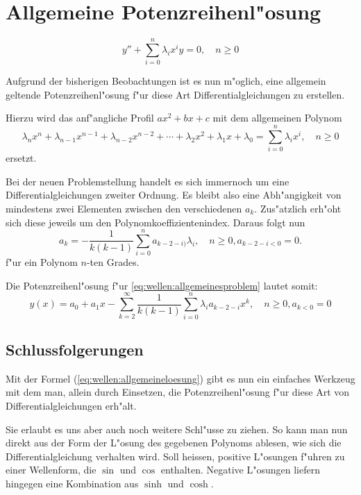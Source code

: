 \section{Allgemeine Potenzreihenl"osung}

\begin{equation}
	y''+\sum_{i=0}^{n}\lambda_ix^i y=0, \quad n \ge 0
	\label{eq:wellen:allgemeinesproblem}
\end{equation}

Aufgrund der bisherigen Beobachtungen ist es nun m"oglich, eine 
allgemein geltende Potenzreihenl"osung f"ur diese Art Differentialgleichungen 
zu erstellen.

Hierzu wird das anf"angliche Profil $ax^2 + bx + c$ mit dem allgemeinen Polynom
\begin{equation*}
	\lambda_nx^n + \lambda_{n-1}x^{n-1} + \lambda_{n-2}x^{n-2} + \dotsb + 
	\lambda_2x^2 + \lambda_1x + \lambda_0 = \sum_{i=0}^{n}\lambda_ix^i, \quad n 
	\ge 0
\end{equation*}
ersetzt.

Bei der neuen Problemstellung handelt es sich immernoch um eine 
Differentialgleichungen zweiter Ordnung. Es bleibt also eine Abh"angigkeit von 
mindestens zwei Elementen zwischen den verschiedenen $a_k$. Zus"atzlich erh"oht 
sich diese jeweils um den Polynomkoeffizientenindex. Daraus folgt nun
\begin{equation*}
	a_k = -\frac{1}{k(k-1)}\sum_{i=0}^{n}a_{k-2-i)}\lambda_i, \quad n \ge 0, 
	a_{k-2-i < 0} =  0.
\end{equation*}
f"ur ein Polynom $n$-ten Grades.

Die Potenzreihenl"osung f"ur \ref{eq:wellen:allgemeinesproblem} lautet somit:
\begin{equation}
	y(x) = a_0 + a_1x - \sum_{k=2}^{\infty}\frac{1}{k(k-1)}\sum_{i=0}^{n}
	\lambda_ia_{k-2-i}x^k, \quad n \ge 0, a_{k < 0} = 0
	\label{eq:wellen:allgemeineloesung}
\end{equation}

\subsection{Schlussfolgerungen}

Mit der Formel (\ref{eq:wellen:allgemeineloesung}) gibt es nun ein einfaches 
Werkzeug mit dem man, allein durch Einsetzen, die Potenzreihenl"osung f"ur 
diese Art von Differentialgleichungen erh"alt.

Sie erlaubt es uns aber auch noch weitere Schl"usse zu ziehen. So kann man 
nun direkt aus der Form der L"osung des gegebenen Polynoms ablesen, wie sich 
die Differentialgleichung verhalten wird. Soll heissen, positive L"osungen 
f"uhren zu einer Wellenform, die $\sin$ und $\cos$ enthalten. Negative 
L"osungen liefern hingegen eine Kombination aus $\sinh$ und $\cosh$.

